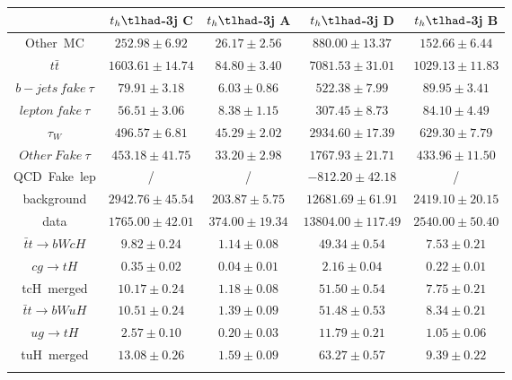 \begin{tabular}{ccccc} \toprule\toprule
 & $t_{h}\tlhad$-3j C & $t_{h}\tlhad$-3j A & $t_{h}\tlhad$-3j D & $t_{h}\tlhad$-3j B\\\midrule
Other~MC & $252.98\pm6.92$ & $26.17\pm2.56$ & $880.00\pm13.37$ & $152.66\pm6.44$\\
$t\bar{t}$ & $1603.61\pm14.74$ & $84.80\pm3.40$ & $7081.53\pm31.01$ & $1029.13\pm11.83$\\
$b-jets~fake~\tau$ & $79.91\pm3.18$ & $6.03\pm0.86$ & $522.38\pm7.99$ & $89.95\pm3.41$\\
$lepton~fake~\tau$ & $56.51\pm3.06$ & $8.38\pm1.15$ & $307.45\pm8.73$ & $84.10\pm4.49$\\
$\tau_{W}$ & $496.57\pm6.81$ & $45.29\pm2.02$ & $2934.60\pm17.39$ & $629.30\pm7.79$\\
$Other~Fake~\tau$ & $453.18\pm41.75$ & $33.20\pm2.98$ & $1767.93\pm21.71$ & $433.96\pm11.50$\\
QCD~Fake~lep &  / &  / & $-812.20\pm42.18$ &  /\\
background & $2942.76\pm45.54$ & $203.87\pm5.75$ & $12681.69\pm61.91$ & $2419.10\pm20.15$\\
data & $1765.00\pm42.01$ & $374.00\pm19.34$ & $13804.00\pm117.49$ & $2540.00\pm50.40$\\
$\bar{t}t\to bWcH$ & $9.82\pm0.24$ & $1.14\pm0.08$ & $49.34\pm0.54$ & $7.53\pm0.21$\\
$cg\to tH$ & $0.35\pm0.02$ & $0.04\pm0.01$ & $2.16\pm0.04$ & $0.22\pm0.01$\\
tcH~merged & $10.17\pm0.24$ & $1.18\pm0.08$ & $51.50\pm0.54$ & $7.75\pm0.21$\\
$\bar{t}t\to bWuH$ & $10.51\pm0.24$ & $1.39\pm0.09$ & $51.48\pm0.53$ & $8.34\pm0.21$\\
$ug\to tH$ & $2.57\pm0.10$ & $0.20\pm0.03$ & $11.79\pm0.21$ & $1.05\pm0.06$\\
tuH~merged & $13.08\pm0.26$ & $1.59\pm0.09$ & $63.27\pm0.57$ & $9.39\pm0.22$\\
\bottomrule\bottomrule\\
\end{tabular}
